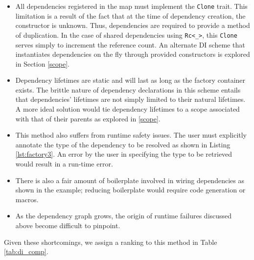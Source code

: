 \documentclass[sigconf]{acmart}
\begin{document}
\begin{itemize}
\item All dependencies registered in the map must implement the \lstinline{Clone} trait. This limitation is a result of the fact that at the time of dependency creation, the constructor is unknown. Thus, dependencies are required to provide a method of duplication. In the case of shared dependencies using \lstinline{Rc<_>}, this \lstinline{Clone} serves simply to increment the reference count. An alternate DI scheme that instantiates dependencies on the fly through provided constructors is explored in Section \ref{scope}.
\item Dependency lifetimes are static and will last as long as the factory container exists. The brittle nature of dependency declarations in this scheme entails that dependencies' lifetimes are not simply limited to their natural lifetimes. A more ideal solution would tie dependency lifetimes to a scope associated with that of their parents as explored in \ref{scope}.
\item This method also suffers from runtime safety issues. The user must explicitly annotate the type of the dependency to be resolved as shown in Listing \ref{lst:factory3}. An error by the user in specifying the type to be retrieved would result in a run-time error.
\item There is also a fair amount of boilerplate involved in wiring dependencies as shown in the example; reducing boilerplate would require code generation or macros.
\item As the dependency graph grows, the origin of runtime failures discussed above become difficult to pinpoint.
\end{itemize}

\begin{minipage}{\linewidth}

\end{minipage}

Given these shortcomings, we assign a ranking to this method in Table \ref{tab:di_comp}.

\begin{minipage}{\linewidth}

\end{minipage}
\end{document}
